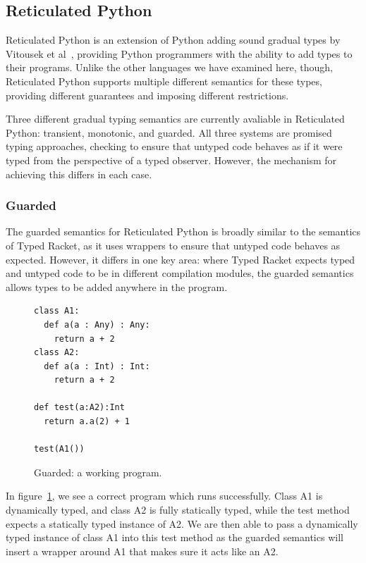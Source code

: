 \documentclass[a4paper,USenglish]{tex/lipics-v2016}
\begin{document}
\subsection{Reticulated Python}

Reticulated Python is an extension of Python adding sound gradual types by
Vitousek et al~\cite{siek14}, providing Python programmers with
the ability to add types to their programs. Unlike the other languages we
have examined here, though, Reticulated Python supports multiple different
semantics for these types, providing different guarantees and imposing
different restrictions.

Three different gradual typing semantics are currently avaliable in
Reticulated Python: transient, monotonic, and guarded. All three systems are
promised typing approaches, checking to ensure that untyped code behaves as
if it were typed from the perspective of a typed observer. However, the
mechanism for achieving this differs in each case.

\subsubsection{Guarded}

The guarded semantics for Reticulated Python is broadly similar to the
semantics of Typed Racket, as it uses wrappers to ensure that untyped code
behaves as expected.  However, it differs in one key area: where Typed
Racket expects typed and untyped code to be in different compilation
modules, the guarded semantics allows types to be added anywhere in the
program.

\begin{figure}[h]
\begin{verbatim}
class A1:
  def a(a : Any) : Any:
    return a + 2
class A2:
  def a(a : Int) : Int:
    return a + 2

def test(a:A2):Int
  return a.a(2) + 1

test(A1())
\end{verbatim}
\caption{Guarded: a working program.}
\label{fig:guard1}
\end{figure}

In figure~\ref{fig:guard1}, we see a correct program which runs
successfully. Class A1 is dynamically typed, and class A2 is fully
statically typed, while the test method expects a statically typed instance
of A2. We are then able to pass a dynamically typed instance of class A1
into this test method as the guarded semantics will insert a wrapper around
A1 that makes sure it acts like an A2.
\end{document}
